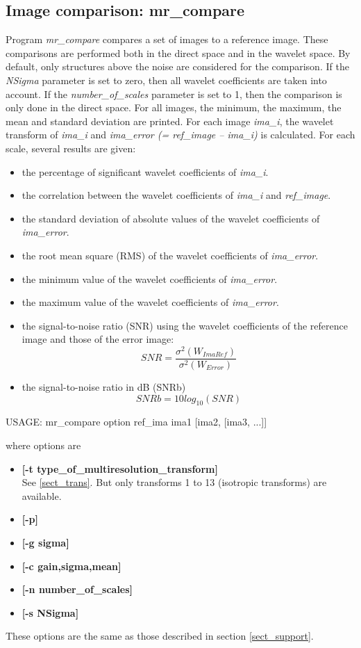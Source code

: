 \subsection{Image comparison: mr\_compare}
Program 
{\em mr\_compare} compares a set of images to a reference image.
These comparisons are performed both in the direct space and in the
wavelet space. By default, only structures above the noise are considered
for the comparison. If the {\em NSigma} parameter is set to zero, then
all wavelet coefficients are taken into account. If the {\em number\_of\_scales}
parameter is set to 1, then the comparison is only done in the direct space.
For all images, the minimum, the maximum, the mean and standard deviation are
printed. For each image {\em ima\_i}, the wavelet transform of {\em ima\_i} and
{\em ima\_error (= ref\_image -- ima\_i)} is calculated. For each scale, 
several results are given:
\begin{itemize}
\item the percentage of significant wavelet coefficients of {\em ima\_i}.
\item the correlation between the wavelet coefficients of {\em ima\_i}
and {\em ref\_image}.
\item the standard deviation of absolute values of the wavelet coefficients of {\em ima\_error}.
\item the root mean square (RMS) of the wavelet coefficients of {\em ima\_error}.
\item the minimum value of the wavelet coefficients of {\em ima\_error}.
\item the maximum value of the wavelet coefficients of {\em ima\_error}.
\item the signal-to-noise ratio (SNR) using the wavelet coefficients of the
reference image and those of the error image: 
\[ SNR = \frac{\sigma^2(W_{ImaRef})}{\sigma^2(W_{Error})}  \]
\item the signal-to-noise ratio in dB (SNRb)
\[ SNRb = 10 log_{10}(SNR) \]
\end{itemize}
{\bf
\begin{center}
USAGE: mr\_compare option ref\_ima ima1 [ima2, [ima3, ...]]
\end{center}}
where options are 
\begin{itemize}
\baselineskip=0.4truecm
\itemsep=0.1truecm
\item {\bf [-t type\_of\_multiresolution\_transform]} \\
See \ref{sect_trans}. But only transforms 1 to 13 
(isotropic transforms) are available.
\item {\bf [-p]} \\
\item {\bf [-g sigma]} \\
\item {\bf [-c gain,sigma,mean]} \\
\item {\bf [-n number\_of\_scales]} 
\item {\bf [-s NSigma]} 
\end{itemize}
These options are the same as those described in 
section \ref{sect_support}.
